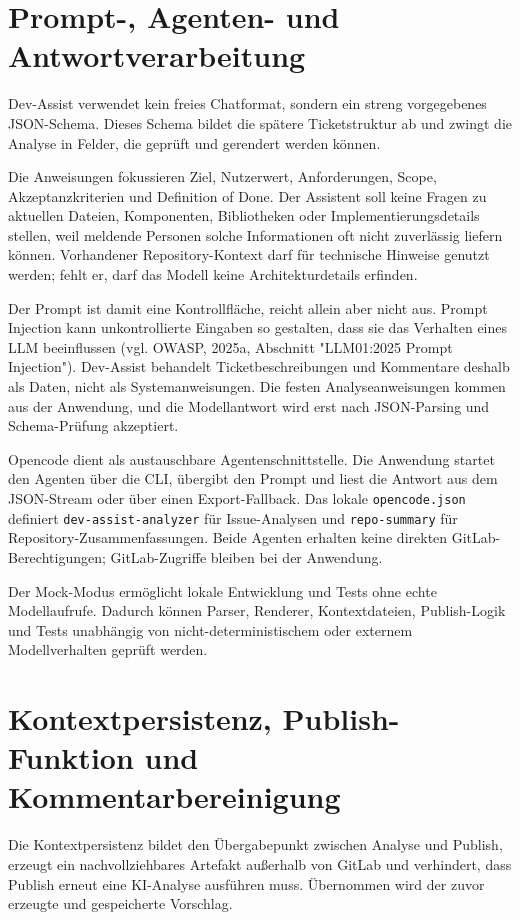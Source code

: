 \documentclass[12pt,a4paper,oneside]{scrreprt}
\begin{document}
\section{Prompt-, Agenten- und Antwortverarbeitung}

Dev-Assist verwendet kein freies Chatformat, sondern ein streng vorgegebenes JSON-Schema. Dieses Schema bildet die spätere Ticketstruktur ab und zwingt die Analyse in Felder, die geprüft und gerendert werden können.

Die Anweisungen fokussieren Ziel, Nutzerwert, Anforderungen, Scope, Akzeptanzkriterien und Definition of Done. Der Assistent soll keine Fragen zu aktuellen Dateien, Komponenten, Bibliotheken oder Implementierungsdetails stellen, weil meldende Personen solche Informationen oft nicht zuverlässig liefern können. Vorhandener Repository-Kontext darf für technische Hinweise genutzt werden; fehlt er, darf das Modell keine Architekturdetails erfinden.

Der Prompt ist damit eine Kontrollfläche, reicht allein aber nicht aus. Prompt Injection kann unkontrollierte Eingaben so gestalten, dass sie das Verhalten eines LLM beeinflussen (vgl. OWASP, 2025a, Abschnitt "LLM01:2025 Prompt Injection"). Dev-Assist behandelt Ticketbeschreibungen und Kommentare deshalb als Daten, nicht als Systemanweisungen. Die festen Analyseanweisungen kommen aus der Anwendung, und die Modellantwort wird erst nach JSON-Parsing und Schema-Prüfung akzeptiert.

Opencode dient als austauschbare Agentenschnittstelle. Die Anwendung startet den Agenten über die CLI, übergibt den Prompt und liest die Antwort aus dem JSON-Stream oder über einen Export-Fallback. Das lokale \texttt{opencode.json} definiert \texttt{dev-assist-analyzer} für Issue-Analysen und \texttt{repo-summary} für Repository-Zusammenfassungen. Beide Agenten erhalten keine direkten GitLab-Berechtigungen; GitLab-Zugriffe bleiben bei der Anwendung.

Der Mock-Modus ermöglicht lokale Entwicklung und Tests ohne echte Modellaufrufe. Dadurch können Parser, Renderer, Kontextdateien, Publish-Logik und Tests unabhängig von nicht-deterministischem oder externem Modellverhalten geprüft werden.

\section{Kontextpersistenz, Publish-Funktion und Kommentarbereinigung}

Die Kontextpersistenz bildet den Übergabepunkt zwischen Analyse und Publish, erzeugt ein nachvollziehbares Artefakt außerhalb von GitLab und verhindert, dass Publish erneut eine KI-Analyse ausführen muss. Übernommen wird der zuvor erzeugte und gespeicherte Vorschlag.
\end{document}
